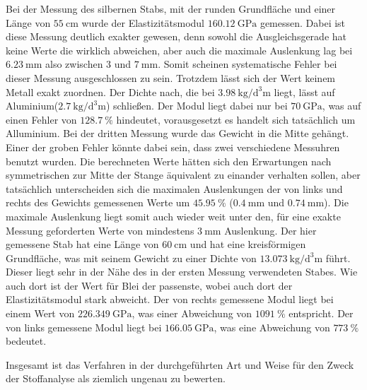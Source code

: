 Bei der Messung des silbernen Stabs, mit der runden Grundfläche und einer Länge von $\SI{55}{\centi\meter}$ wurde der Elastizitätsmodul $\SI{160,12}{\giga\pascal}$ gemessen. Dabei ist diese Messung deutlich exakter gewesen, denn sowohl die Ausgleichsgerade hat keine Werte die wirklich abweichen, aber auch die maximale Auslenkung lag bei $\SI{6,23}{\milli\meter}$ also zwischen $3$ und $\SI{7}{\milli\meter}$. Somit scheinen systematische Fehler bei dieser Messung ausgeschlossen zu sein. Trotzdem lässt sich der Wert keinem Metall exakt zuordnen. Der Dichte nach, die bei $\SI{3.98}{\kilo\gram\per\cubic\deci\meter}$ liegt, lässt auf Aluminium($\SI{2,7}{\kilo\gram\per\cubic\deci\meter}$) schließen. Der Modul liegt dabei nur bei $\SI{70}{\giga\pascal}$, was auf einen Fehler von $\SI{128,7}{\percent}$ hindeutet, vorausgesetzt es handelt sich tatsächlich um Alluminium.
\noindent
Bei der dritten Messung wurde das Gewicht in die Mitte gehängt. Einer der groben Fehler könnte dabei sein, dass zwei verschiedene Messuhren benutzt wurden. Die berechneten Werte hätten sich den Erwartungen nach symmetrischen zur Mitte der Stange äquivalent zu einander verhalten sollen, aber tatsächlich unterscheiden sich die maximalen Auslenkungen der von links und rechts des Gewichts gemessenen Werte um $\SI{45,95}{\percent}$ ($\SI{0,4}{\milli\meter}$ und $\SI{0,74}{\milli\meter}$). 
Die maximale Auslenkung liegt somit auch wieder weit unter den, für eine exakte Messung geforderten Werte von mindestens $\SI{3}{\milli\meter}$ Auslenkung. 
Der hier gemessene Stab hat eine Länge von $\SI{60}{\centi\meter}$ und hat eine kreisförmigen Grundfläche, was mit seinem Gewicht zu einer Dichte von $\SI{13,073}{\kilo\gram\per\cubic\deci\meter}$ führt. Dieser liegt sehr in der Nähe des in der ersten Messung verwendeten Stabes. Wie auch dort ist der Wert für Blei der passenste, wobei auch dort der Elastizitätsmodul stark abweicht. 
Der von rechts gemessene Modul liegt bei einem Wert von $\SI{226,349}{\giga\pascal}$, was einer Abweichung von $\SI{1091}{\percent}$ entspricht. Der von links gemessene Modul liegt bei $\SI{166,05}{\giga\pascal}$, was eine Abweichung von $\SI{773}{\percent}$ bedeutet. 
\noindent

Insgesamt ist das Verfahren in der durchgeführten Art und Weise für den Zweck der Stoffanalyse als ziemlich ungenau zu bewerten. 


